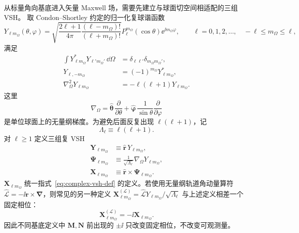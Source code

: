 从标量角向基底进入矢量 Maxwell 场，需要先建立与球面切空间相适配的三组 VSH。
取 Condon--Shortley 约定的归一化复球谐函数
\begin{equation}
Y_{\ell m_{\Omega}}(\theta,\varphi)
=\sqrt{\frac{2\ell+1}{4\pi}
\frac{(\ell-m_{\Omega})!}{(\ell+m_{\Omega})!}}
P_\ell^{m_{\Omega}}(\cos\theta)\ee^{\ii m_{\Omega}\varphi},
\qquad
\ell=0,1,2,\ldots,
\quad
-\ell\le m_{\Omega}\le\ell,
\label{eq:complex-spherical-harmonic}
\end{equation}
满足
\begin{align}
\int Y_{\ell m_{\Omega}}^*Y_{\ell' m_{\Omega}'}\,\dd\Omega
&=\delta_{\ell\ell'}\delta_{m_{\Omega}m_{\Omega}'},
\\
Y_{\ell,-m_{\Omega}}
&=(-1)^{m_{\Omega}} Y_{\ell m_{\Omega}}^*,
\\
\nabla_\Omega^2Y_{\ell m_{\Omega}}
&=-\ell(\ell+1)Y_{\ell m_{\Omega}}.
\end{align}
这里
\begin{equation}
\nabla_\Omega
=\hat{\bm\theta}\,\frac{\partial}{\partial\theta}
+\hat{\bm\varphi}\,\frac{1}{\sin\theta}
\frac{\partial}{\partial\varphi}
\end{equation}
是单位球面上的无量纲梯度。为避免后面反复出现
$\ell(\ell+1)$，记
\begin{equation}
\Lambda_\ell\equiv\ell(\ell+1).
\end{equation}
对 $\ell\ge1$ 定义三组复 VSH
\begin{align}
\bm Y_{\ell m_{\Omega}}
&\equiv \hat{\bm r}\,Y_{\ell m_{\Omega}},
\\
\bm\Psi_{\ell m_{\Omega}}
&\equiv\frac{1}{\sqrt{\Lambda_\ell}}
\nabla_\Omega Y_{\ell m_{\Omega}},
\\
\bm X_{\ell m_{\Omega}}
&\equiv\hat{\bm r}\times\bm\Psi_{\ell m_{\Omega}}.
\label{eq:complex-vsh-def}
\end{align}
$\bm X_{\ell m_{\Omega}}$ 统一指式~\eqref{eq:complex-vsh-def} 的定义。若使用无量纲轨道角动量算符
$\widehat{\bm{\mathcal L}}=-\ii\bm r\times\bm\nabla$，则常见的另一种定义
$\bm X_{\ell m_{\Omega}}^{(\mathcal L)}=\widehat{\bm{\mathcal L}}Y_{\ell m_{\Omega}}/\sqrt{\Lambda_\ell}$
与上述定义相差一个固定相位：
\begin{equation}
\bm X_{\ell m_{\Omega}}^{(\mathcal L)}=-\ii\bm X_{\ell m_{\Omega}}.
\label{eq:vsh-phase-relation}
\end{equation}
因此不同基底定义中 $\bm M,\bm N$ 前出现的 $\pm\ii$ 只改变固定相位，不改变可观测量。

